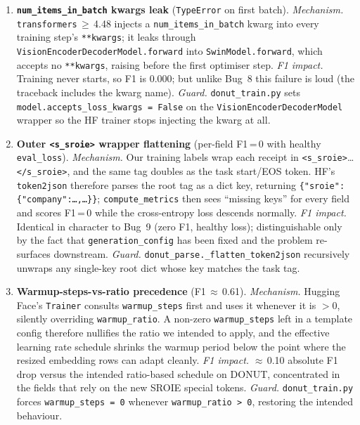 \documentclass[conference]{IEEEtran}
\begin{document}
\begin{enumerate}
\item \textbf{\texttt{num\_items\_in\_batch} kwargs leak}
  (\texttt{TypeError} on first batch).
  \textit{Mechanism.} \texttt{transformers}\,$\geq$\,4.48 injects a
  \texttt{num\_items\_in\_batch} kwarg into every training step's
  \texttt{**kwargs}; it leaks through
  \texttt{VisionEncoderDecoderModel.forward} into
  \texttt{SwinModel.forward}, which accepts no \texttt{**kwargs},
  raising before the first optimiser step.  \textit{F1 impact.}
  Training never starts, so F1 is 0.000; but unlike Bug~8 this
  failure is loud (the traceback includes the kwarg name).
  \textit{Guard.} \texttt{donut\_train.py} sets
  \texttt{model.accepts\_loss\_kwargs = False} on the
  \texttt{VisionEncoderDecoderModel} wrapper so the HF trainer stops
  injecting the kwarg at all.

\item \textbf{Outer \texttt{<s\_sroie>} wrapper flattening}
  (per-field F1\,=\,0 with healthy \texttt{eval\_loss}).
  \textit{Mechanism.} Our training labels wrap each receipt in
  \texttt{<s\_sroie>}\ldots\texttt{</s\_sroie>}, and the same tag
  doubles as the task start/EOS token.  HF's \texttt{token2json}
  therefore parses the root tag as a dict key, returning
  \texttt{\{"sroie":\{"company":\ldots,\ldots\}\}};
  \texttt{compute\_metrics} then sees ``missing keys'' for every
  field and scores F1\,=\,0 while the cross-entropy loss descends
  normally.  \textit{F1 impact.} Identical in character to Bug~9
  (zero F1, healthy loss); distinguishable only by the fact that
  \texttt{generation\_config} has been fixed and the problem
  re-surfaces downstream.  \textit{Guard.}
  \texttt{donut\_parse.\_flatten\_token2json} recursively unwraps
  any single-key root dict whose key matches the task tag.

\item \textbf{Warmup-steps-vs-ratio precedence} (F1\,$\approx$\,0.61).
  \textit{Mechanism.} Hugging Face's \texttt{Trainer} consults
  \texttt{warmup\_steps} first and uses it whenever it is $>$0,
  silently overriding \texttt{warmup\_ratio}.  A non-zero
  \texttt{warmup\_steps} left in a template config therefore
  nullifies the ratio we intended to apply, and the effective
  learning rate schedule shrinks the warmup period below the point
  where the resized embedding rows can adapt cleanly.
  \textit{F1 impact.} $\approx$\,0.10 absolute F1 drop versus the
  intended ratio-based schedule on DONUT, concentrated in the
  fields that rely on the new SROIE special tokens.
  \textit{Guard.} \texttt{donut\_train.py} forces
  \texttt{warmup\_steps\,=\,0} whenever
  \texttt{warmup\_ratio\,>\,0}, restoring the intended behaviour.


\end{enumerate}
\end{document}

